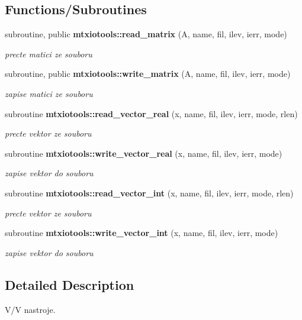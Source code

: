\subsection*{Functions/\+Subroutines}
\begin{DoxyCompactItemize}
\item 
subroutine, public {\bf mtxiotools\+::read\+\_\+matrix} (A, name, fil, ilev, ierr, mode)
\begin{DoxyCompactList}\small\item\em precte matici ze souboru \end{DoxyCompactList}\item 
subroutine, public {\bf mtxiotools\+::write\+\_\+matrix} (A, name, fil, ilev, ierr, mode)
\begin{DoxyCompactList}\small\item\em zapise matici ze souboru \end{DoxyCompactList}\item 
subroutine {\bf mtxiotools\+::read\+\_\+vector\+\_\+real} (x, name, fil, ilev, ierr, mode, rlen)
\begin{DoxyCompactList}\small\item\em precte vektor ze souboru \end{DoxyCompactList}\item 
subroutine {\bf mtxiotools\+::write\+\_\+vector\+\_\+real} (x, name, fil, ilev, ierr, mode)
\begin{DoxyCompactList}\small\item\em zapise vektor do souboru \end{DoxyCompactList}\item 
subroutine {\bf mtxiotools\+::read\+\_\+vector\+\_\+int} (x, name, fil, ilev, ierr, mode, rlen)
\begin{DoxyCompactList}\small\item\em precte vektor ze souboru \end{DoxyCompactList}\item 
subroutine {\bf mtxiotools\+::write\+\_\+vector\+\_\+int} (x, name, fil, ilev, ierr, mode)
\begin{DoxyCompactList}\small\item\em zapise vektor do souboru \end{DoxyCompactList}\end{DoxyCompactItemize}


\subsection{Detailed Description}
V/V nastroje. 


